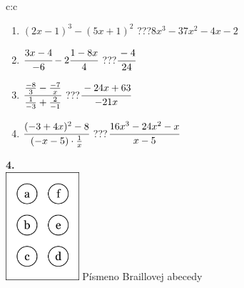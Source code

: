 \documentclass[10pt]{report}
\begin{document}
\begin{tabular}{c:c}
\begin{minipage}[c][104.5mm][t]{0.5\linewidth}
\begin{center}
\begin{minipage}{0.79\linewidth}
\begin{center}
\begin{varwidth}{\linewidth}
\begin{enumerate}
\item $(2x-1)^3-(5x+1)^2$\quad \dotfill\; ???\;\dotfill \quad $8x^3-37x^2-4x-2$
\item $\cfrac{3x-4}{-6}-2\cfrac{1-8x}{4}$\quad \dotfill\; ???\;\dotfill \quad $\cfrac{-4}{24}$
\item $\cfrac{\frac{-8}{3}-\frac{-7}{x}}{\frac{1}{-3}+\frac{2}{-1}}$\quad \dotfill\; ???\;\dotfill \quad $\cfrac{-24x+63}{-21x}$
\item $\cfrac{(-3+4x)^2-8}{(-x-5)\cdot\frac{1}{x}}$\quad \dotfill\; ???\;\dotfill \quad $\cfrac{16x^3-24x^2-x}{x-5}$
\end{enumerate}
\end{varwidth}
\end{center}
\end{minipage}
\begin{minipage}{0.20\linewidth}
\begin{center}
{\Huge\bfseries 4.} \\[2mm]
\includegraphics[height=40mm]{../images/braille.png}
{\small Písmeno Braillovej abecedy}
\end{center}
\end{minipage}
\end{center}
\end{minipage}
%
\end{tabular}
\newpage
\thispagestyle{empty}
\end{document}
